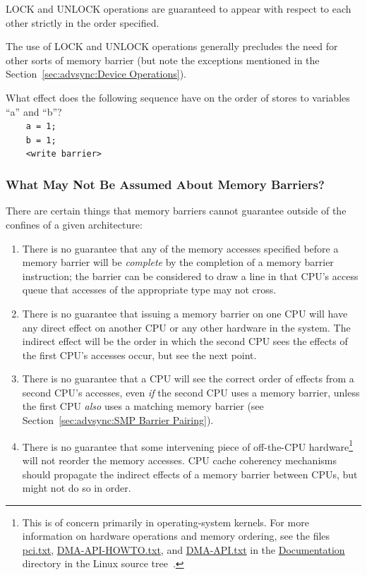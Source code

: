 LOCK and UNLOCK operations are guaranteed to appear with respect to each
other strictly in the order specified.

The use of LOCK and UNLOCK operations generally precludes the need for
other sorts of memory barrier (but note the exceptions mentioned in the
Section~\ref{sec:advsync:Device Operations}).

\QuickQuiz{}
	What effect does the following sequence have on the
	order of stores to variables ``a'' and ``b''? \\
	{\tt ~~~~a = 1;} \\
	{\tt ~~~~b = 1;} \\
	{\tt ~~~~<write barrier>}
 \QuickQuizEnd

\subsubsection{What May Not Be Assumed About Memory Barriers?}
\label{sec:advsync:What May Not Be Assumed About Memory Barriers?}

There are certain things that memory barriers cannot guarantee outside
of the confines of a given architecture:

\begin{enumerate}
\item	There is no guarantee that any of the memory accesses specified
	before a memory barrier will be \emph{complete} by the completion
	of a memory barrier instruction; the barrier can be considered
	to draw a line in that CPU's access queue that accesses of the
	appropriate type may not cross.
\item	There is no guarantee that issuing a memory barrier on one CPU
	will have any direct effect on another CPU or any other hardware
	in the system.	The indirect effect will be the order in which
	the second CPU sees the effects of the first CPU's accesses occur,
	but see the next point.
\item	There is no guarantee that a CPU will see the correct order
	of effects from a second CPU's accesses, even \emph{if} the second CPU
	uses a memory barrier, unless the first CPU \emph{also} uses a matching
	memory barrier (see
	Section~\ref{sec:advsync:SMP Barrier Pairing}).
\item	There is no guarantee that some intervening piece of off-the-CPU
	hardware\footnote{
		This is of concern primarily in operating-system kernels.
		For more information on hardware operations and memory
		ordering, see the files \url{pci.txt}, \url{DMA-API-HOWTO.txt},
		and \url{DMA-API.txt} in the \url{Documentation} directory in
		the Linux source tree~\cite{Torvalds2.6kernel}.}
	will not reorder the memory accesses.  CPU cache
	coherency mechanisms should propagate the indirect effects of
	a memory barrier between CPUs, but might not do so in order.
\end{enumerate}

